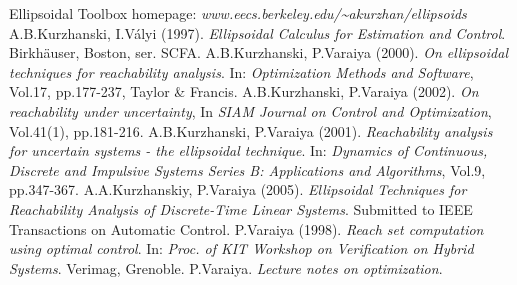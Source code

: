 \documentclass{report}
\begin{document}
\begin{thebibliography}{XX}
 Ellipsoidal Toolbox homepage:
{\it www.eecs.berkeley.edu/\~{ }akurzhan/ellipsoids}
 A.B.Kurzhanski, I.V\'{a}lyi (1997). {\it Ellipsoidal
Calculus for Estimation and Control}. Birkh\"{a}user, Boston, ser. SCFA.
 A.B.Kurzhanski, P.Varaiya (2000). {\it On ellipsoidal
techniques for reachability analysis}. In: {\it Optimization Methods and
Software}, Vol.17, pp.177-237, Taylor \& Francis.
 A.B.Kurzhanski, P.Varaiya (2002). {\it On reachability
under uncertainty}, In {\it SIAM Journal on Control and Optimization},
Vol.41(1), pp.181-216.
 A.B.Kurzhanski, P.Varaiya (2001). {\it Reachability analysis
for uncertain systems - the ellipsoidal technique}.
In: {\it Dynamics of Continuous, Discrete and Impulsive Systems Series B:
Applications and Algorithms}, Vol.9, pp.347-367.
 A.A.Kurzhanskiy, P.Varaiya (2005).
{\it Ellipsoidal Techniques for Reachability Analysis of Discrete-Time
Linear Systems}. Submitted to IEEE Transactions on Automatic Control.
 P.Varaiya (1998). {\it Reach set computation
using optimal control}. In: {\it Proc. of KIT Workshop on Verification
on Hybrid Systems}. Verimag, Grenoble.
 P.Varaiya. {\it Lecture notes on optimization}.


\end{thebibliography}
\end{document}
